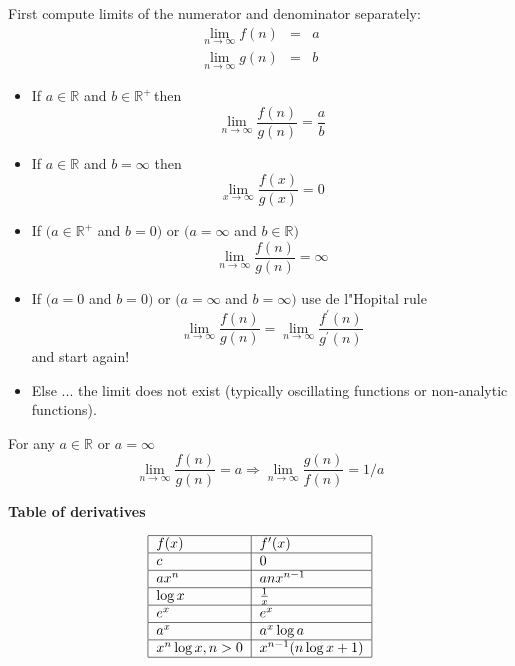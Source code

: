 \documentclass[justified, sixbynine]{tufte-book}
\def\subsubsection#1{{\bf #1}}
\theoremstyle{plain}%
\newtheorem * {corollary}{Corollary}
\theoremstyle{definition}
\theoremstyle{remark}
\newtheorem * {remark}{Remark}
\newtheorem * {note}{Note}
\begin{document}
\begin{fullwidth}
First compute limits of the numerator and denominator separately:
\begin{eqnarray}
\lim_{n\rightarrow \infty }f(n) &=&a \\
\lim_{n\rightarrow \infty }g(n) &=&b
\end{eqnarray}

\begin{itemize}
\item  If $a\in \mathbb{R}$ and $b\in \mathbb{R}^{+}\, $then
\begin{equation}
\lim_{n\rightarrow \infty }\frac{f(n)}{g(n)}=\frac ab
\end{equation}

\item  If $a\in \mathbb{R}$ and $b=\infty $ then
\begin{equation}
\lim_{x\rightarrow \infty }\frac{f(x)}{g(x)}=0
\end{equation}

\item  If $(a\in \mathbb{R}^{+}$ and $b=0)$ or $(a=\infty$ and $b\in
\mathbb{R})$
\begin{equation}
\lim_{n\rightarrow \infty }\frac{f(n)}{g(n)}=\infty
\end{equation}

\item  If $(a=0$ and $b=0)$ or $(a=\infty$ and $b=\infty)$
use de l"Hopital rule
\begin{equation}
\lim_{n\rightarrow \infty }\frac{f(n)}{g(n)}=\lim_{n\rightarrow \infty }%
\frac{f^{\prime }(n)}{g^{\prime }(n)}
\end{equation}
and start again!

\item  Else ... the limit does not exist (typically oscillating functions or
non-analytic functions).
\end{itemize}

For any $a\in \mathbb{R}$ or $a=\infty $%
\begin{equation}
\lim_{n\rightarrow \infty }\frac{f(n)}{g(n)}=a\Rightarrow \lim_{n\rightarrow
\infty }\frac{g(n)}{f(n)}=1/a
\end{equation}

\subsubsection{Table of derivatives}

\begin{equation}
\begin{tabular}{|l|l|}
\hline
$f(x)$ & $f^{\prime }(x)$ \\ \hline
$c$ & $0$ \\ \hline
$ax^n$ & $anx^{n-1}$ \\ \hline
$\log x$ & $\frac 1x$ \\ \hline
$e^x$ & $e^x$ \\ \hline
$a^x$ & $a^x\log a$ \\ \hline
$x^n\log x, n>0$ & $x^{n-1}(n\log x+1)$ \\ \hline
\end{tabular}
\end{equation}


\end{fullwidth}
\end{document}
